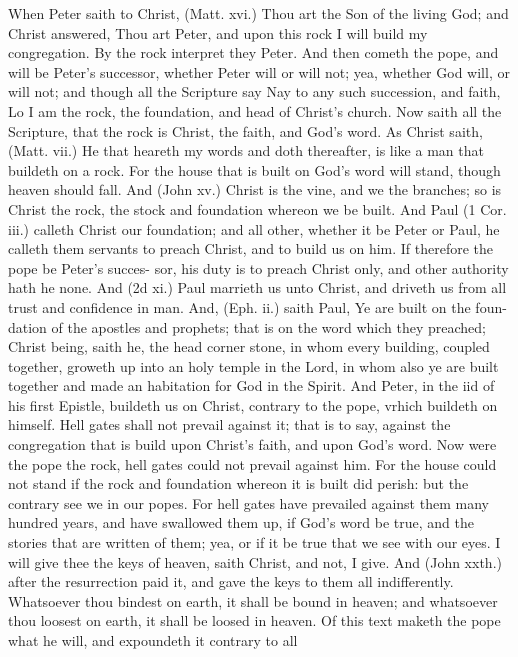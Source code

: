\documentclass{custom}
\begin{document}
When Peter saith to Christ, (Matt. xvi.) Thou art the 
Son of the living God; and Christ answered, Thou art 
Peter, and upon this rock I will build my congregation. 
By the rock interpret they Peter. And then cometh the 
pope, and will be Peter's successor, whether Peter will 
or will not; yea, whether God will, or will not; and though 
all the Scripture say Nay to any such succession, and faith, 
Lo I am the rock, the foundation, and head of Christ's 
church. Now saith all the Scripture, that the rock is 
Christ, the faith, and God's word. As Christ saith, 
(Matt. vii.) He that heareth my words and doth thereafter, 
is like a man that buildeth on a rock. For the house that 
is built on God's word will stand, though heaven should 
fall. And (John xv.) Christ is the vine, and we the 
branches; so is Christ the rock, the stock and foundation 
whereon we be built. And Paul (1 Cor. iii.) calleth 
Christ our foundation; and all other, whether it be Peter 
or Paul, he calleth them servants to preach Christ, and to 
build us on him. If therefore the pope be Peter's succes- 
sor, his duty is to preach Christ only, and other authority 
hath he none. And (2d xi.) Paul marrieth us unto 
Christ, and driveth us from all trust and confidence in man. 
And, (Eph. ii.) saith Paul, Ye are built on the foun- 
dation of the apostles and prophets; that is on the word 
which they preached; Christ being, saith he, the head 
corner stone, in whom every building, coupled together, 
groweth up into an holy temple in the Lord, in whom also 
ye are built together and made an habitation for God in 
the Spirit. And Peter, in the iid of his first Epistle, buildeth 
us on Christ, contrary to the pope, vrhich buildeth on 
himself. Hell gates shall not prevail against it; that is to 
say, against the congregation that is build upon Christ's 
faith, and upon God's word. Now were the pope the 
rock, hell gates could not prevail against him. For the 
house could not stand if the rock and foundation whereon 
it is built did perish: but the contrary see we in our popes. 
For hell gates have prevailed against them many hundred 
years, and have swallowed them up, if God's word be 
true, and the stories that are written of them; yea, or if 
it be true that we see with our eyes. I will give thee the 
keys of heaven, saith Christ, and not, I give. And (John 
xxth.) after the resurrection paid it, and gave the keys to 
them all indifferently. Whatsoever thou bindest on earth, 
it shall be bound in heaven; and whatsoever thou loosest 
on earth, it shall be loosed in heaven. Of this text maketh 
the pope what he will, and expoundeth it contrary to all 
\end{document}
